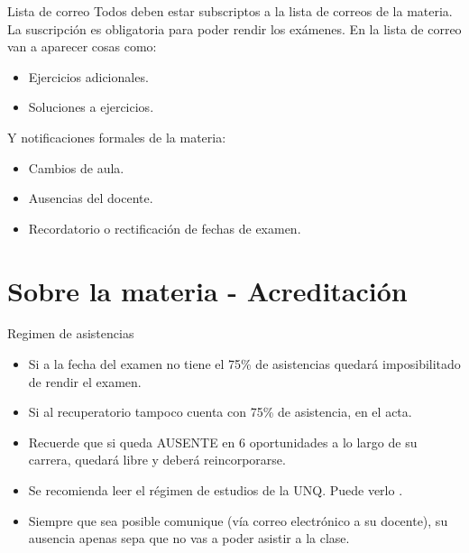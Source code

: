 \begin{frame}{Lista de correo}
  Todos deben estar subscriptos a la lista de correos de la materia.
  La suscripción es obligatoria para poder rendir los exámenes.
  \jump
  En la lista de correo van a aparecer cosas como:
  \begin{itemize}
    \item Ejercicios adicionales.
    \item Soluciones a ejercicios.
  \end{itemize}
  \emptyline
  Y notificaciones formales de la materia:
  \begin{itemize}
    \item Cambios de aula.
    \item Ausencias del docente.
    \item Recordatorio o rectificación de fechas de examen.
  \end{itemize}
  \emptyline
{}

\end{frame}


\section{Sobre la materia - Acreditación}


\begin{frame}{Regimen de asistencias}
  \small
  \begin{itemize}
    \item Si a la fecha del examen no tiene el 75\% de asistencias quedará
      imposibilitado de rendir el examen.
    \item Si al recuperatorio tampoco cuenta con 75\% de asistencia,
       en el acta.
    \item Recuerde que si queda AUSENTE en 6 oportunidades a lo largo de su
      carrera, quedará libre y deberá reincorporarse.
      \item Se recomienda leer el régimen de estudios de la UNQ. Puede verlo
      .
    \item Siempre que sea posible comunique (vía correo electrónico a su docente),
        su ausencia apenas sepa que no vas a poder asistir a la clase.
  \end{itemize}
\end{frame}

